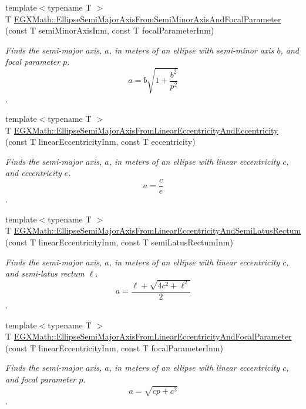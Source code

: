 \begin{DoxyCompactItemize}
{\footnotesize template$<$typename T $>$ }\\T \mbox{\hyperlink{group___e_g_x_math-_geometry-2_d-_ellipse-_semi_major_axis_ga8d8abd93ee6cdf43ba490874218f925f}{E\+G\+X\+Math\+::\+Ellipse\+Semi\+Major\+Axis\+From\+Semi\+Minor\+Axis\+And\+Focal\+Parameter}} (const T semi\+Minor\+Axis\+Inm, const T focal\+Parameter\+Inm)
\begin{DoxyCompactList}\small\item\em Finds the semi-\/major axis, $a$, in meters of an ellipse with semi-\/minor axis $b$, and focal parameter $p$. \[ a=b\sqrt{1+\dfrac{b^2}{p^2}} \]. \end{DoxyCompactList}\item 
{\footnotesize template$<$typename T $>$ }\\T \mbox{\hyperlink{group___e_g_x_math-_geometry-2_d-_ellipse-_semi_major_axis_gaf013b5a5e305696948669e348c7dd1c1}{E\+G\+X\+Math\+::\+Ellipse\+Semi\+Major\+Axis\+From\+Linear\+Eccentricity\+And\+Eccentricity}} (const T linear\+Eccentricity\+Inm, const T eccentricity)
\begin{DoxyCompactList}\small\item\em Finds the semi-\/major axis, $a$, in meters of an ellipse with linear eccentricity $c$, and eccentricity $e$. \[ a=\dfrac{c}{e} \]. \end{DoxyCompactList}\item 
{\footnotesize template$<$typename T $>$ }\\T \mbox{\hyperlink{group___e_g_x_math-_geometry-2_d-_ellipse-_semi_major_axis_gad5fde13ad96aede92a1c476d373bc295}{E\+G\+X\+Math\+::\+Ellipse\+Semi\+Major\+Axis\+From\+Linear\+Eccentricity\+And\+Semi\+Latus\+Rectum}} (const T linear\+Eccentricity\+Inm, const T semi\+Latus\+Rectum\+Inm)
\begin{DoxyCompactList}\small\item\em Finds the semi-\/major axis, $a$, in meters of an ellipse with linear eccentricity $c$, and semi-\/latus rectum $\ell$. \[ a=\dfrac{\ell+\sqrt{4c^2+\ell^2}}{2} \]. \end{DoxyCompactList}\item 
{\footnotesize template$<$typename T $>$ }\\T \mbox{\hyperlink{group___e_g_x_math-_geometry-2_d-_ellipse-_semi_major_axis_gad77cbdb5c764cb11bc79a7373d0b6881}{E\+G\+X\+Math\+::\+Ellipse\+Semi\+Major\+Axis\+From\+Linear\+Eccentricity\+And\+Focal\+Parameter}} (const T linear\+Eccentricity\+Inm, const T focal\+Parameter\+Inm)
\begin{DoxyCompactList}\small\item\em Finds the semi-\/major axis, $a$, in meters of an ellipse with linear eccentricity $c$, and focal parameter $p$. \[ a=\sqrt{cp + c^2} \]. \end{DoxyCompactList}\item 

\end{DoxyCompactItemize}
